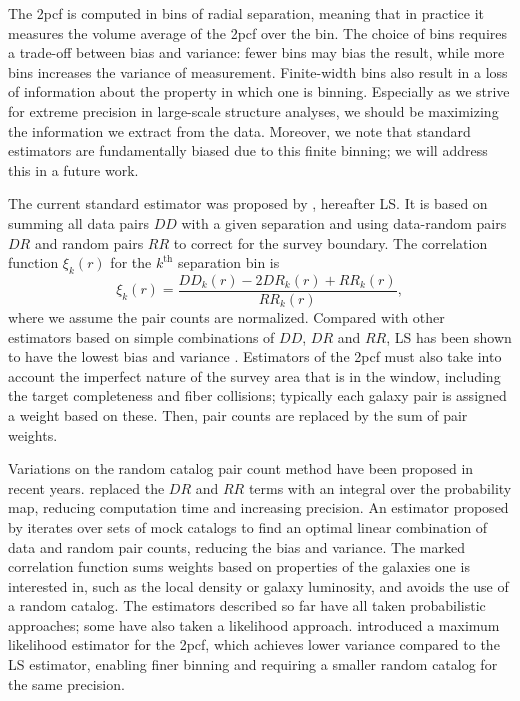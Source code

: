 \documentclass[modern]{aastex62}
\newcommand{\cf}{2pcf\xspace} %
\newcommand{\LS}{LS\xspace}
\begin{document}
The \cf is computed in bins of radial separation, meaning that in practice it measures the volume average of the \cf over the bin. %
The choice of bins requires a trade-off between bias and variance: fewer bins may bias the result, while more bins increases the variance of measurement.
Finite-width bins also result in a loss of information about the property in which one is binning. 
Especially as we strive for extreme precision in large-scale structure analyses, we should be maximizing the information we extract from the data.
Moreover, we note that standard estimators are fundamentally biased due to this finite binning; we will address this in a future work. %

The current standard estimator was proposed by \cite{LandySzalay1993}, hereafter \LS. It is based on summing all data pairs $DD$ with a given separation and using data-random pairs $DR$ and random pairs $RR$ to correct for the survey boundary. The correlation function $\xi_k(r)$ for the $k^\mathrm{th}$ separation bin is
\begin{equation}
\xi_k(r) = \frac{DD_k(r) - 2DR_k(r) + RR_k(r)}{RR_k(r)},
\end{equation}
where we assume the pair counts are normalized. %
Compared with other estimators based on simple combinations of $DD$, $DR$ and $RR$, \LS has been shown to have the lowest bias and variance \citep{Kerscher2000}. %
Estimators of the \cf must also take into account the imperfect nature of the survey area that is in the window, including the target completeness and fiber collisions; typically each galaxy pair is assigned a weight based on these. %
Then, pair counts are replaced by the sum of pair weights.

Variations on the random catalog pair count method have been proposed in recent years.
\cite{Demina2016} replaced the $DR$ and $RR$ terms with an integral over the probability map, reducing computation time and increasing precision.
An estimator proposed by \cite{VargasMagana2013} iterates over sets of mock catalogs to find an optimal linear combination of data and random pair counts, reducing the bias and variance.
The marked correlation function \citep{WhitePadmanabhan2009} sums weights based on properties of the galaxies one is interested in, such as the local density or galaxy luminosity, and avoids the use of a random catalog.
The estimators described so far have all taken probabilistic approaches; some have also taken a likelihood approach.
\cite{BaxterRozo2013} introduced a maximum likelihood estimator for the \cf, which achieves lower variance compared to the \LS estimator, enabling finer binning and requiring a smaller random catalog for the same precision.
\end{document}

